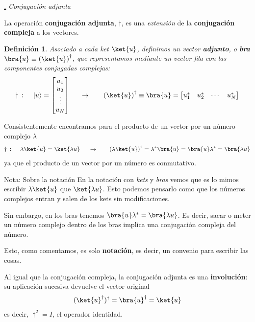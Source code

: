 \documentclass[a4paper,11pt]{book} %
\newtheorem{definicion_contador}{Definición}
\newcommand{\Definicion}[1]{
		\begin{mybox_gray2}{}
			\begin{definicion_contador}
				 #1 
			\end{definicion_contador} 
		\end{mybox_gray2}
	}
\numberwithin{equation}{chapter}
\def\subsubiContadorIt{\par\addtocounter{subsubsection}{1}\underline{\it\thesubsubsection.}\hskip0.5cm \setcounter{subsubsubsectionIt}{0}}
\newcommand{\SubsubiIt}[1]{
		\subsubiContadorIt \textit{#1}
	}
\newcounter{subsubsubsectionIt}[subsubsection]
\begin{document}
		\SubsubiIt{Conjugación adjunta}
		
La operación \textbf{conjugación adjunta},  $\dagger$, es una \textit{extensión} de la \textbf{conjugación compleja}  a los vectores.

	\Definicion{Asociado a cada \textit{ket }$\ket{u}$, definimos un vector \textbf{adjunto}, o \textbf{bra} $\bra{u}\equiv\left(\ket{u}\right)^\dagger$,  que representamos mediante un vector fila con las componentes conjugadas complejas:  
		\begin{equation}
\dagger \,: \quad\,|u\rangle = \begin{bmatrix} {u_1}\\ {u_2}\\ \vdots \\ {u_N} \end{bmatrix} 
~~~~~{\rightarrow}~~~~~~ \left(\ket{u}\right)^\dagger \equiv \bra{u} =\begin{bmatrix} {u_1^*} & {u_2^*} & \cdots & {u_N^*}
\end{bmatrix}
		\end{equation}
	}

Consistentemente encontramos para el producto de un vector por un número complejo $\lambda$
	\begin{equation}
	\dagger \,:\quad\,  \lambda\ket{u}=\ket{\lambda u} ~~~~~{\rightarrow}~~~~~~ \left(\lambda\ket{u}\right)^\dagger=\lambda^*\bra{u} = \bra{u}\lambda^* = \bra{\lambda u}
	\end{equation}
ya que el producto de un vector por un número es conmutativo.		
		
	\begin{mybox_blue}{Nota: Sobre la notación}
	En la notación con \textit{kets} y \textit{bras} vemos que es lo mimos escribir $\lambda\ket{u}$ que $\ket{\lambda u}$. Esto podemos pensarlo como que los números complejos entran y salen de los kets sin modificaciones. 
	\vspace{0.3cm}
	
	Sin embargo, en los bras tenemos $\bra{u}\lambda^* = \bra{\lambda u}$. Es decir, sacar o meter un número complejo dentro de los bras implica una conjugación compleja del número. 
	\vspace{0.3cm}
	
	Esto, como comentamos, es solo \textbf{notación}, es decir, un convenio para escribir las cosas.
	\end{mybox_blue}
		
Al igual que la conjugación compleja, la conjugación adjunta es una \textbf{involución}: su aplicación sucesiva devuelve el vector original
$$
(\ket{u}^\dagger)^\dagger =\bra{u}^\dagger =  \ket{u}
$$
es decir, $\dagger^2 = I$, el operador identidad.		
		
\end{document}
